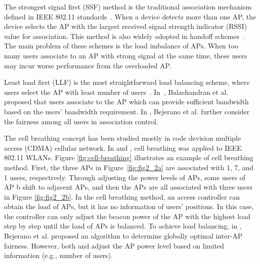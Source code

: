 The strongest signal first (SSF) method is the traditional association mechanism defined in IEEE 802.11 standards~\cite{ieee2001ieee}. 
	When a device detects more than one AP, the device selects the AP with the largest received signal strength indicator (RSSI) value for association.
This method is also widely adopted in handoff schemes~\cite{teng2009d,wu2007proactive}.
	The main problem of these schemes is the load imbalance of APs. 
	When too many users associate to an AP with strong signal at the same time, these users may incur worse performance from the overloaded AP.
	
	Least load first (LLF) is the most straightforward load balancing scheme, where users select the  AP with least number of users~\cite{papanikos2001study}.
	In~\cite{balachandran2002hot}, Balachandran et al. proposed 
	that users associate to the AP which can provide sufficient bandwidth based on the users' bandwidth requirement. 
	In \cite{bejerano2004fairness}, Bejerano et al. further consider the fairness among all users in  association control.

The cell breathing concept has been studied mostly in code devision multiple access (CDMA) cellular network. 
In \cite{bahl2007cell} and \cite{bejerano2009cell}, cell breathing was applied to IEEE 802.11 WLANs. 
Figure \ref{fig:cell-breathing} illustrates an example of cell breathing method. 
First, the three APs in Figure~\ref{fig:fig2_2a} are associated with 1, 7, and 1 users, respectively.
Through adjusting the power levels of APs, some users of AP b shift to adjacent APs, and then the APs are all associated with three users in Figure \ref{fig:fig2_2b}. 
In the cell breathing method, an access controller can obtain the load of APs, but 
it has no information of users' positions. 
In this case, the controller can only adjust the beacon power of the AP with the highest load step by step until the load of APs is balanced.
To achieve load balancing, in \cite{bejerano2009cell}, Bejerano et al. proposed an algorithm to determine globally optimal inter-AP fairness. 
However, both \cite{bahl2007cell} and \cite{bejerano2009cell} 
adjust the AP power level based on limited information (e.g., number of users).

